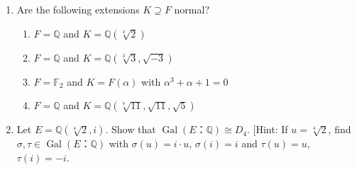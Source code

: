 \documentclass[12pt,a4paper]{article}
\DeclareMathOperator{\gal}{Gal}
\begin{document}
\begin{enumerate}
\item Are the following extensions $K\supseteq F$ normal?
\begin{enumerate} 
\item $F=\mathbb{Q}$ and $K=\mathbb{Q}(\sqrt[4]{2})$
\item $F=\mathbb{Q}$ and $K=\mathbb{Q}(\sqrt[3]{3}, \sqrt{-3})$
\item $F=\mathbb{F}_2$ and $K=F(\alpha)$ with $\alpha^3 + \alpha + 1 = 0$
\item $F=\mathbb{Q}$ and $K=\mathbb{Q}(\sqrt[7]{11}, \sqrt{11},\sqrt{5})$
\end{enumerate}
\item Let $E = ℚ(\sqrt[4]{2},i)$. Show that $\gal(E：ℚ) ≅ D_4$. [Hint: If $u = \sqrt[4]{2}$, find $σ,τ ∈ \gal(E：ℚ)$ with $σ(u) = i⋅u$, $σ(i) = i$ and $τ(u) = u$, $τ(i) = -i$. 

\end{enumerate}
\end{document}
